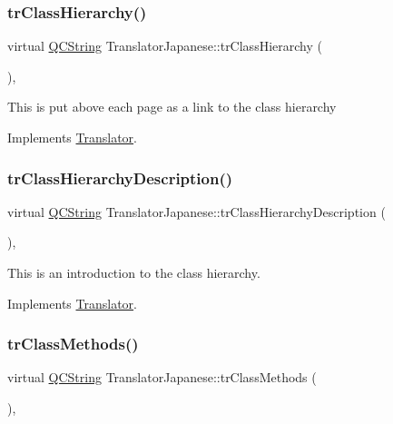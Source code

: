\subsubsection{\texorpdfstring{trClassHierarchy()}{trClassHierarchy()}}
{\footnotesize\ttfamily virtual \mbox{\hyperlink{class_q_c_string}{Q\+C\+String}} Translator\+Japanese\+::tr\+Class\+Hierarchy (\begin{DoxyParamCaption}{ }\end{DoxyParamCaption})\hspace{0.3cm}{\ttfamily [inline]}, {\ttfamily [virtual]}}

This is put above each page as a link to the class hierarchy 

Implements \mbox{\hyperlink{class_translator}{Translator}}.

\mbox{\label{class_translator_japanese_af1edda6affca4f6f036214e25b62b830}} 
\subsubsection{\texorpdfstring{trClassHierarchyDescription()}{trClassHierarchyDescription()}}
{\footnotesize\ttfamily virtual \mbox{\hyperlink{class_q_c_string}{Q\+C\+String}} Translator\+Japanese\+::tr\+Class\+Hierarchy\+Description (\begin{DoxyParamCaption}{ }\end{DoxyParamCaption})\hspace{0.3cm}{\ttfamily [inline]}, {\ttfamily [virtual]}}

This is an introduction to the class hierarchy. 

Implements \mbox{\hyperlink{class_translator}{Translator}}.

\mbox{\label{class_translator_japanese_a0790c233fafbc9884b5061fd3298a153}} 
\subsubsection{\texorpdfstring{trClassMethods()}{trClassMethods()}}
{\footnotesize\ttfamily virtual \mbox{\hyperlink{class_q_c_string}{Q\+C\+String}} Translator\+Japanese\+::tr\+Class\+Methods (\begin{DoxyParamCaption}{ }\end{DoxyParamCaption})\hspace{0.3cm}{\ttfamily [inline]}, {\ttfamily [virtual]}}

